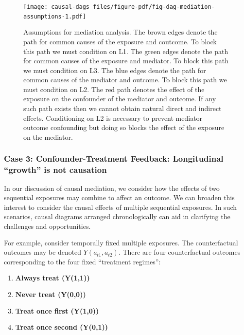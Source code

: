 \documentclass[
  singlecolumn]{article}
\begin{document}
\begin{figure}

{\centering \texttt{[image: causal-dags\_files/figure-pdf/fig-dag-mediation-assumptions-1.pdf]}

}

\caption{\label{fig-dag-mediation-assumptions}Assumptions for mediation
analysis. The brown edges denote the path for common causes of the
exposure and coutcome. To block this path we must condition on L1. The
green edges denote the path for common causes of the exposure and
mediator. To block this path we must condition on L3. The blue edges
denote the path for common causes of the mediator and outcome. To block
this path we must condition on L2. The red path denotes the effect of
the exposure on the confounder of the mediator and outcome. If any such
path exists then we cannot obtain natural direct and indirect effects.
Conditioning on L2 is necessary to prevent mediator outcome confounding
but doing so blocks the effect of the exposure on the mediator.}

\end{figure}

\hypertarget{case-3-confounder-treatment-feedback-longitudinal-growth-is-not-causation}{%
\subsubsection{Case 3: Confounder-Treatment Feedback: Longitudinal
``growth'' is not
causation}\label{case-3-confounder-treatment-feedback-longitudinal-growth-is-not-causation}}

In our discussion of causal mediation, we consider how the effects of
two sequential exposures may combine to affect an outcome. We can
broaden this interest to consider the causal effects of multiple
sequential exposures. In such scenarios, causal diagrams arranged
chronologically can aid in clarifying the challenges and opportunities.

For example, consider temporally fixed multiple exposures. The
counterfactual outcomes may be denoted \(Y(a_{t1} ,a_{t2})\). There are
four counterfactual outcomes corresponding to the four fixed ``treatment
regimes'':

\begin{enumerate}
\def\labelenumi{\arabic{enumi}.}
\item
  \textbf{Always treat (Y(1,1))}
\item
  \textbf{Never treat (Y(0,0))}
\item
  \textbf{Treat once first (Y(1,0))}
\item
  \textbf{Treat once second (Y(0,1))}
\end{enumerate}
\end{document}
